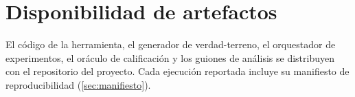 \documentclass[conference]{IEEEtran}
\begin{document}








\section*{Disponibilidad de artefactos}
El código de la herramienta, el generador de verdad-terreno, el orquestador de
experimentos, el oráculo de calificación y los guiones de análisis se
distribuyen con el repositorio del proyecto. Cada ejecución reportada incluye
su manifiesto de reproducibilidad (\cref{sec:manifiesto}).



\end{document}
